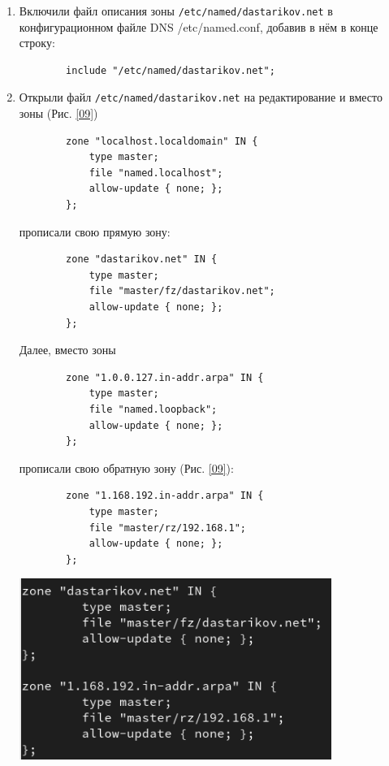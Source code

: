 \begin{enumerate}
    \item Включили файл описания зоны {\tt /etc/named/dastarikov.net} в конфигурационном файле DNS /etc/named.conf, добавив в нём в конце строку:
        \begin{verbatim}
        include "/etc/named/dastarikov.net";
        \end{verbatim}
    \item Открыли файл {\tt /etc/named/dastarikov.net} на редактирование и вместо зоны (Рис. \ref{09})
        \begin{verbatim}
        zone "localhost.localdomain" IN {
            type master;
            file "named.localhost";
            allow-update { none; };
        };
        \end{verbatim}
    прописали свою прямую зону:
        \begin{verbatim}
        zone "dastarikov.net" IN {
            type master;
            file "master/fz/dastarikov.net";
            allow-update { none; };
        };
        \end{verbatim}
    Далее, вместо зоны
        \begin{verbatim}
        zone "1.0.0.127.in-addr.arpa" IN {
            type master;
            file "named.loopback";
            allow-update { none; };
        };
        \end{verbatim}
    прописали свою обратную зону (Рис. \ref{09}):
        \begin{verbatim}
        zone "1.168.192.in-addr.arpa" IN {
            type master;
            file "master/rz/192.168.1";
            allow-update { none; };
        };
        \end{verbatim}

\begin{center}
    \centering
    \includegraphics[width=0.8\textwidth]{../images/image09.png}
    \label{09}
\end{center}


\end{enumerate}
